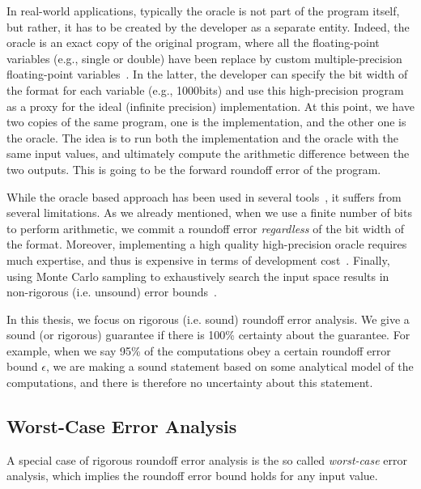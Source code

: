 In real-world applications, typically the oracle is not part of the program itself, but rather, it has to be created by the developer as a separate entity.
%
Indeed, the oracle is an exact copy of the original program, where all the floating-point variables (e.g., single or double) have been replace by custom multiple-precision floating-point variables~\cite{mpfr}.
%
In the latter, the developer can specify the bit width of the format for each variable (e.g., 1000bits) and use this high-precision program as a proxy for the ideal (infinite precision) implementation.
%
At this point, we have two copies of the same program, one is the implementation, and the other one is the oracle. 
%
The idea is to run both the implementation and the oracle with the same input values, and ultimately compute the arithmetic difference between the two outputs. 
%
This is going to be the forward roundoff error of the program. 
%

While the oracle based approach has been used in several tools~\cite{landau2014guide, kahan1996improbability, atomic, blame, herbie}, it suffers from several limitations.
%
As we already mentioned, when we use a finite number of bits to perform arithmetic, we commit a roundoff error \emph{regardless} of the bit width of the format.
%
%
Moreover, implementing a high quality high-precision oracle requires much expertise, and thus is expensive in terms of development cost~\cite{atomic}.
%
Finally, using Monte Carlo sampling to exhaustively search the input space results in non-rigorous (i.e. unsound) error bounds~\cite{glasserman2013monte, parker2000monte}.
%

In this thesis, we focus on rigorous (i.e. sound) roundoff error analysis.
%
We give a sound (or rigorous) guarantee if there is 100\% certainty about the guarantee.
%
%
For example, when we say 95\% of the computations obey a certain roundoff error bound $\epsilon$, we are making a sound statement based on some analytical model of the computations, and there is therefore no uncertainty about this statement.
%
%
\subsection{Worst-Case Error Analysis}
\label{sec:worst}
%
A special case of rigorous roundoff error analysis is the so called \emph{worst-case} error analysis, which implies the roundoff error bound holds for any input value.
%

